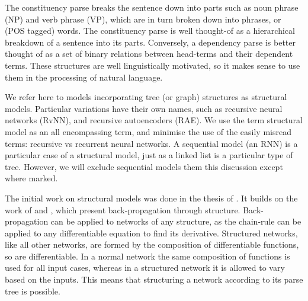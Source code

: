 {The constituency parse breaks the sentence down into parts such as noun phrase (NP) and verb phrase (VP),
which are in turn broken down into phrases, or (POS tagged) words.
The constituency parse is well thought-of as a hierarchical breakdown of a sentence into its parts.
Conversely, a dependency parse is better thought of as a set of binary relations between head-terms and their dependent terms.
These structures are well linguistically motivated, so it makes sense to use them in the processing of natural language.




We refer here to models incorporating tree (or graph) structures as structural models.
Particular variations have their own names, such as recursive neural networks (RvNN), and recursive autoencoders (RAE).
We use the term structural model as an all encompassing term,
and minimise the use of the easily misread terms: recursive vs recurrent  neural networks.
A sequential model  (an RNN) is a particular case of a structural model, just as a linked list is a particular type of tree.
However, we will exclude sequential models them this discussion except where marked.

The initial work on structural models was done in the thesis of .
It builds on the work of  and , which present back-propagation through structure.
Back-propagation can be applied to networks of any structure, 
as the chain-rule can be applied to any differentiable equation to find its derivative.
Structured networks, like all other networks, are formed by the composition of differentiable functions, so are differentiable.
In a normal network the same composition of functions is used for all input cases,
whereas in a structured network it is allowed to vary based on the inputs.
This means that structuring a network according to its parse tree is possible.







}
